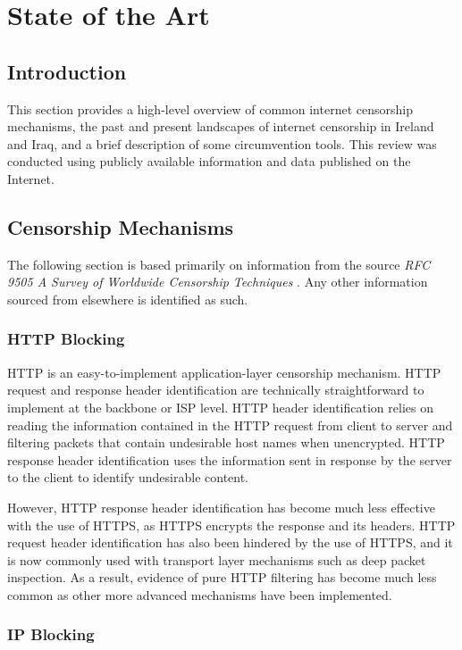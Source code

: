 \chapter{State of the Art}

\section{Introduction}

This section provides a high-level overview of common internet censorship mechanisms, the past and present landscapes of internet censorship in Ireland and Iraq, and a brief description of some circumvention tools. This review was conducted using publicly available information and data published on the Internet.

\section{Censorship Mechanisms}

The following section is based primarily on information from the source \textit{RFC 9505
A Survey of Worldwide Censorship Techniques} \cite{rfc9505}. Any other information sourced from elsewhere is identified as such.

\subsection{HTTP Blocking}

HTTP is an easy-to-implement application-layer censorship mechanism. HTTP request and response header identification are technically straightforward to implement at the backbone or ISP level. HTTP header identification relies on reading the information contained in the HTTP request from client to server and filtering packets that contain undesirable host names when unencrypted. HTTP response header identification uses the information sent in response by the server to the client to identify undesirable content. 

However, HTTP response header identification has become much less effective with the use of HTTPS, as HTTPS encrypts the response and its headers. HTTP request header identification has also been hindered by the use of HTTPS, and it is now commonly used with transport layer mechanisms such as deep packet inspection. As a result, evidence of pure HTTP filtering has become much less common as other more advanced mechanisms have been implemented. 

\subsection{IP Blocking}

